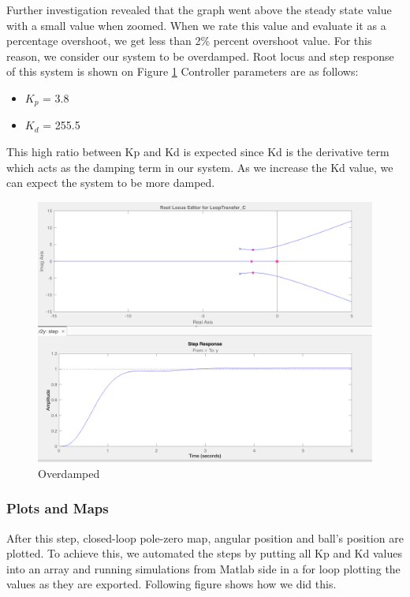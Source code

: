 Further investigation revealed that the graph went above the steady state value with a small value when zoomed. When we rate this value and evaluate it as a percentage overshoot, we get less than 2\% percent overshoot value. For this reason, we consider our system to be overdamped. Root locus and step response of this system is shown on Figure \ref{fig:over_csd} Controller parameters are as follows:
\begin{itemize}
    \item $K_p$ = 3.8
    \item$K_d$ = 255.5
\end{itemize}

This high ratio between Kp and Kd is expected since Kd is the derivative term which acts as the damping term in our system. As we increase the Kd value, we can expect the system to be more damped. 

\begin{figure}[H]
    \centering
    \includegraphics[width=.7\textwidth]{images/over_csd.png}
    \caption{Overdamped}
    \label{fig:over_csd}
\end{figure}


\newpage
\subsubsection{Plots and Maps}
After this step, closed-loop pole-zero map, angular position and ball's position are plotted. To achieve this, we automated the steps by putting all Kp and Kd values into an array and running simulations from Matlab side in a for loop plotting the values as they are exported. Following figure shows how we did this.


